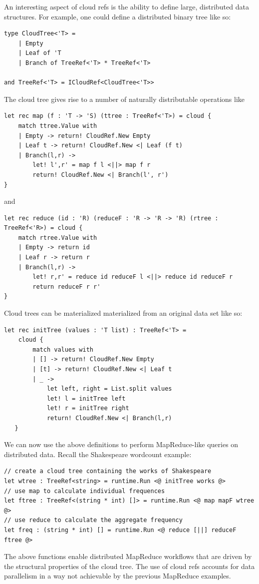 \documentclass[9pt,a4paper]{article}
\begin{document}
An interesting aspect of cloud refs is the ability to define large, distributed
data structures. For example, one could define a distributed binary tree like so:
\begin{lstlisting}
type CloudTree<'T> = 
    | Empty
    | Leaf of 'T
    | Branch of TreeRef<'T> * TreeRef<'T>

and TreeRef<'T> = ICloudRef<CloudTree<'T>>
\end{lstlisting}
The cloud tree gives rise to a number of naturally distributable operations like
\begin{lstlisting}
let rec map (f : 'T -> 'S) (ttree : TreeRef<'T>) = cloud {
    match ttree.Value with
    | Empty -> return! CloudRef.New Empty
    | Leaf t -> return! CloudRef.New <| Leaf (f t)
    | Branch(l,r) ->
        let! l',r' = map f l <||> map f r
        return! CloudRef.New <| Branch(l', r')
}
\end{lstlisting}
and
\begin{lstlisting}
let rec reduce (id : 'R) (reduceF : 'R -> 'R -> 'R) (rtree : TreeRef<'R>) = cloud {
    match rtree.Value with
    | Empty -> return id
    | Leaf r -> return r
    | Branch(l,r) ->
        let! r,r' = reduce id reduceF l <||> reduce id reduceF r
        return reduceF r r'
}
\end{lstlisting}
Cloud trees can be materialized materialized from an original data set like so:
\begin{lstlisting}
let rec initTree (values : 'T list) : TreeRef<'T> =
    cloud {
        match values with
        | [] -> return! CloudRef.New Empty
        | [t] -> return! CloudRef.New <| Leaf t
        | _ ->
            let left, right = List.split values
            let! l = initTree left 
            let! r = initTree right
            return! CloudRef.New <| Branch(l,r)
   }
\end{lstlisting}
We can now use the above definitions to perform MapReduce-like queries on distributed data.
Recall the Shakespeare wordcount example:
\begin{lstlisting}
// create a cloud tree containing the works of Shakespeare
let wtree : TreeRef<string> = runtime.Run <@ initTree works @>
// use map to calculate individual frequences
let ftree : TreeRef<(string * int) []> = runtime.Run <@ map mapF wtree @>
// use reduce to calculate the aggregate frequency
let freq : (string * int) [] = runtime.Run <@ reduce [||] reduceF ftree @>
\end{lstlisting}
The above functions enable distributed MapReduce workflows that are 
driven by the structural properties of the cloud tree.
The use of cloud refs accounts for data parallelism in a way not achievable
by the previous MapReduce examples.
\end{document}
